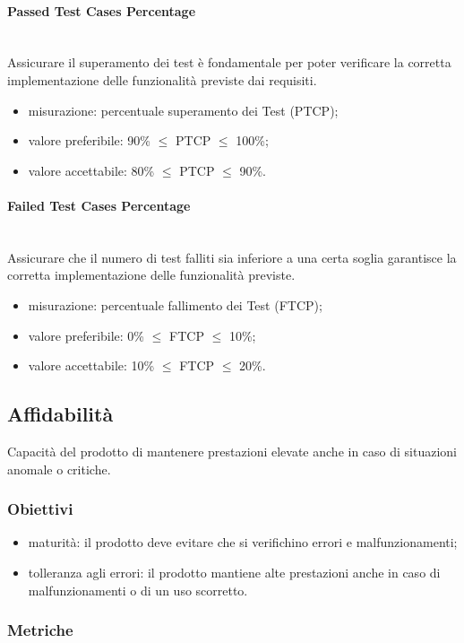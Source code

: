 			\paragraph{Passed Test Cases Percentage}\mbox{}\\
			Assicurare il superamento dei test è fondamentale per poter verificare la corretta implementazione delle funzionalità previste dai requisiti.
			\begin{itemize}
				\item misurazione: percentuale superamento dei Test (PTCP);
				\item valore preferibile: 90\% $\leq$ PTCP $\leq$ 100\%;
				\item valore accettabile: 80\% $\leq$ PTCP $\leq$ 90\%.
			\end{itemize}
			\paragraph{Failed Test Cases Percentage}\mbox{}\\
			Assicurare che il numero di test falliti sia inferiore a una certa soglia garantisce la corretta implementazione delle funzionalità previste.
			\begin{itemize}
				\item misurazione: percentuale fallimento dei Test (FTCP);
				\item valore preferibile: 0\% $\leq$ FTCP $\leq$ 10\%;
				\item valore accettabile: 10\% $\leq$ FTCP $\leq$ 20\%.
			\end{itemize}
	\subsection{Affidabilità}
	Capacità del prodotto di mantenere prestazioni elevate anche in caso di situazioni anomale o critiche.
		\subsubsection{Obiettivi}
		\begin{itemize}
			\item maturità: il prodotto deve evitare che si verifichino errori e malfunzionamenti;
			\item tolleranza agli errori: il prodotto mantiene alte prestazioni anche in caso di malfunzionamenti o di un uso scorretto.
		\end{itemize}
		\subsubsection{Metriche}

